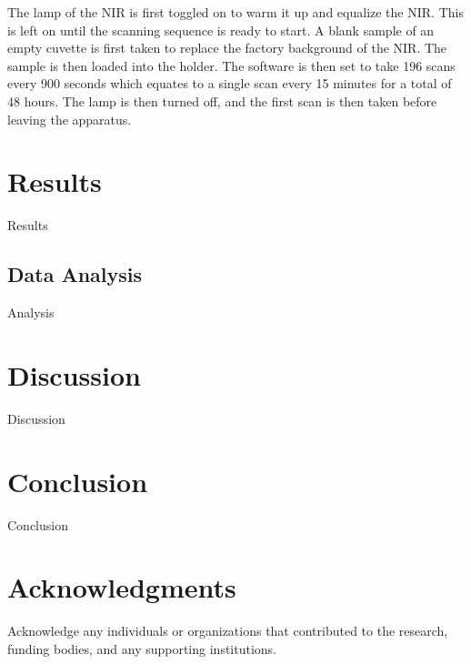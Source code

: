 \documentclass[final, 3p, 11pt]{elsarticle}
\begin{document}
The lamp of the NIR is first toggled on to warm it up and equalize the NIR. This is left on until the scanning sequence is ready to start. A blank sample of an empty cuvette is first taken to replace the factory background of the NIR. The sample is then loaded into the holder. The software is then set to take 196 scans every 900 seconds which equates to a single scan every 15 minutes for a total of 48 hours. The lamp is then turned off, and the first scan is then taken before leaving the apparatus. 

\section{Results}
Results

\subsection{Data Analysis}
Analysis

\section{Discussion}
Discussion

\section{Conclusion}
Conclusion

\section*{Acknowledgments}
Acknowledge any individuals or organizations that contributed to the research, funding bodies, and any supporting institutions.

\newpage


\end{document}
